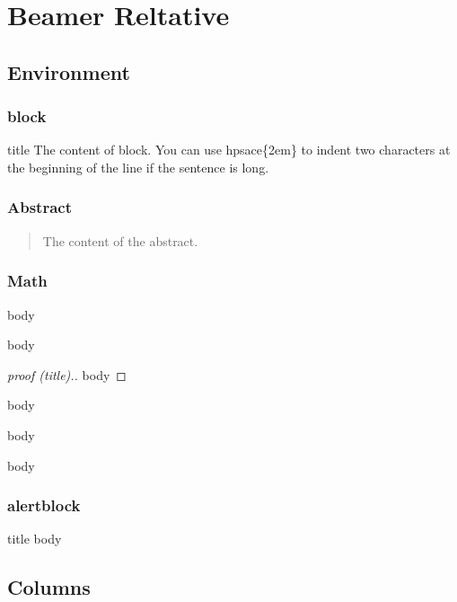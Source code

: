\documentclass[
    10pt,
    pdf,
    UTF8,
    aspectratio=169
]{beamer}
\begin{document}
\section{Beamer Reltative}

\subsection{Environment}

\begin{frame}
    \frametitle{block}
    \begin{block}{title}
        \hspace{2em} The content of block.
        You can use hpsace\{2em\} to indent two characters at the beginning of the line if the sentence is long.
    \end{block}
\end{frame}
\begin{frame}
    \frametitle{Abstract}
    \begin{abstract}
        The content of the abstract.
    \end{abstract}
\end{frame}
\begin{frame}[allowframebreaks]
    \frametitle{Math}
    \begin{theorem}[title]
        body
    \end{theorem}
    \begin{lemma}[title]
        body
    \end{lemma}
    \begin{proof}[proof (title).]
        body
    \end{proof}
    \begin{corollary}[title]
        body
    \end{corollary}
    \begin{example}[title]
        body
    \end{example}
    \begin{definition}[title]
        body
    \end{definition}
\end{frame}

\begin{frame}
    \frametitle{alertblock}
    \begin{alertblock}{title}
        body
    \end{alertblock}
\end{frame}

\subsection{Columns}
\end{document}
